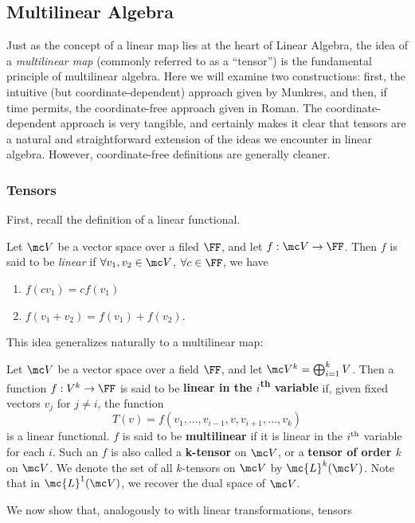 \documentclass{fkbook}
\theoremstyle{snazzydefinition}
\begin{document}
\subsection{Multilinear Algebra}
Just as the concept of a linear map lies at the heart of Linear
Algebra, the idea of a \emph{multilinear map} (commonly referred to as
a ``tensor'') is the fundamental principle of multilinear algebra.
Here we will examine two constructions: first, the intuitive (but
coordinate-dependent) approach given by Munkres, and then, if time
permits, the coordinate-free approach given in Roman. The
coordinate-dependent approach is very tangible, and certainly makes it
clear that tensors are a natural and straightforward extension of the
ideas we encounter in linear algebra. However, coordinate-free
definitions are generally cleaner.
\subsubsection{Tensors}
First, recall the definition of a linear functional.
\begin{definition}
  Let $\mc V$ be a vector space over a filed $\FF$, and let $f : \mc V
  \to \FF$. Then $f$ is said to be \emph{linear} if $\forall v_1, v_2
  \in \mc V$, $\forall c \in \FF$, we have
  \begin{enumerate}[label=\arabic*.]
    \item $f(cv_1) = cf(v_1)$
    \item $f(v_1 + v_2) = f(v_1) + f(v_2)$.
  \end{enumerate}
\end{definition}
This idea generalizes naturally to a multilinear map:
\begin{definition}[Tensor]
  Let $\mc V$ be a vector space over a field $\FF$, and let
  $\mc V^k = \bigoplus_{i=1}^k V$. Then a function $f : V^k \to \FF$
  is said to be \textbf{linear in the
    $i$\textsuperscript{\textnormal{th}} variable} if, given fixed
  vectors $v_j$ for $j \neq i$, the function
  \[
    T(v) = f(v_1, \ldots, v_{i-1}, v, v_{i+1}, \ldots, v_k)
  \]
  is a linear functional. $f$ is said to be \textbf{multilinear} if it
  is linear in the $i\textsuperscript{th}$ variable for each $i$. Such
  an $f$ is also called a \textbf{k-tensor} on $\mc V$, or a
  \textbf{tensor of order $k$} on $\mc V$. We denote the set of all
  $k$-tensors on $\mc V$ by $\mc{L}^k(\mc V)$. Note that in $\mc{L}^1
  (\mc V)$, we recover the dual space of $\mc V$.
\end{definition}
We now show that, analogously to with linear transformations, tensors
\end{document}
